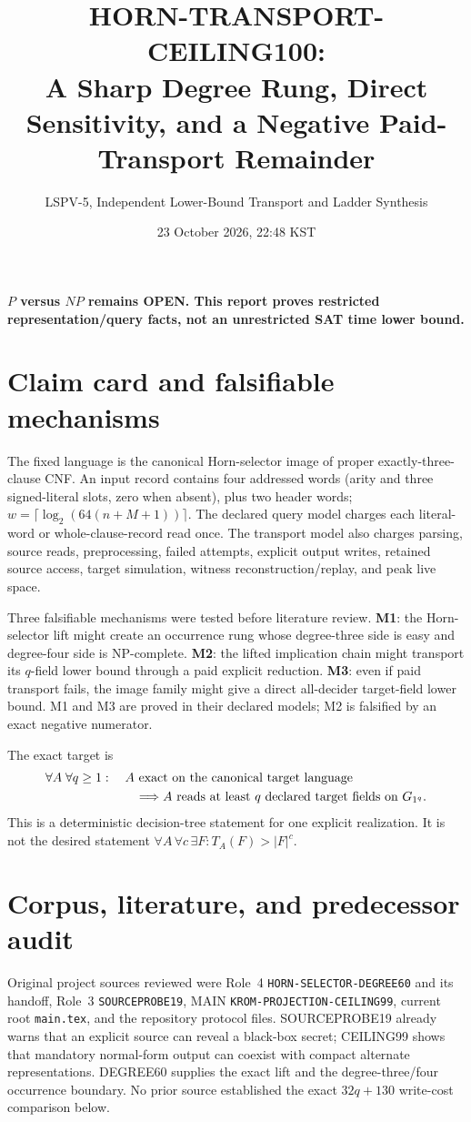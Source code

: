 \documentclass[11pt]{article}
\title{HORN-TRANSPORT-CEILING100:\\A Sharp Degree Rung, Direct Sensitivity, and a Negative Paid-Transport Remainder}
\author{LSPV-5, Independent Lower-Bound Transport and Ladder Synthesis}
\date{23 October 2026, 22:48 KST}
\begin{document}
\maketitle
\begin{center}\textbf{$P$ versus $NP$ remains OPEN. This report proves restricted representation/query facts, not an unrestricted SAT time lower bound.}\end{center}

\section{Claim card and falsifiable mechanisms}
The fixed language is the canonical Horn-selector image of proper exactly-three-clause CNF.  An input record contains four addressed words (arity and three signed-literal slots, zero when absent), plus two header words; $w=\lceil\log_2(64(n+M+1))\rceil$.  The declared query model charges each literal-word or whole-clause-record read once.  The transport model also charges parsing, source reads, preprocessing, failed attempts, explicit output writes, retained source access, target simulation, witness reconstruction/replay, and peak live space.

Three falsifiable mechanisms were tested before literature review.  \textbf{M1}: the Horn-selector lift might create an occurrence rung whose degree-three side is easy and degree-four side is NP-complete.  \textbf{M2}: the lifted implication chain might transport its $q$-field lower bound through a paid explicit reduction.  \textbf{M3}: even if paid transport fails, the image family might give a direct all-decider target-field lower bound.  M1 and M3 are proved in their declared models; M2 is falsified by an exact negative numerator.

The exact target is
\[
\begin{aligned}
  &\forall A\;\forall q\ge1:\quad
  A\text{ exact on the canonical target language}\\
  &\hspace{2.5cm}\Longrightarrow
  A\text{ reads at least }q\text{ declared target fields on }G_{1^q}.
\end{aligned}
\]
This is a deterministic decision-tree statement for one explicit realization.  It is not the desired statement $\forall A\,\forall c\,\exists F:T_A(F)>|F|^c$.

\section{Corpus, literature, and predecessor audit}
Original project sources reviewed were Role~4 \texttt{HORN-SELECTOR-DEGREE60} and its handoff, Role~3 \texttt{SOURCEPROBE19}, MAIN \texttt{KROM-PROJECTION-CEILING99}, current root \texttt{main.tex}, and the repository protocol files.  SOURCEPROBE19 already warns that an explicit source can reveal a black-box secret; CEILING99 shows that mandatory normal-form output can coexist with compact alternate representations.  DEGREE60 supplies the exact lift and the degree-three/four occurrence boundary.  No prior source established the exact $32q+130$ write-cost comparison below.
\end{document}
